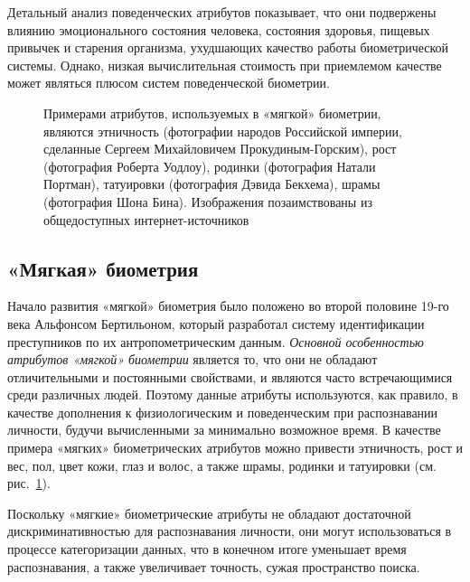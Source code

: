\documentclass[12pt]{book}
\begin{document}
{Детальный анализ поведенческих атрибутов показывает, что они подвержены влиянию эмоционального состояния человека, состояния здоровья, пищевых привычек и старения организма, ухудшающих качество работы биометрической системы. Однако, низкая вычислительная стоимость при приемлемом качестве может являться плюсом систем поведенческой биометрии.

}

\begin{figure}[]
\caption{Примерами атрибутов, используемых в «мягкой» биометрии, являются этничность (фотографии народов Российской империи, сделанные Сергеем Михайловичем Прокудиным-Горским), рост (фотография Роберта Уодлоу), родинки (фотография Натали Портман), татуировки (фотография Дэвида Бекхема), шрамы (фотография Шона Бина). Изображения позаимствованы из общедоступных интернет-источников}
\label{fig:figure_1_6}
\end{figure}

\subsection{«Мягкая» биометрия}

\large{Начало развития «мягкой» биометрия \cite{unar_2014} было положено во второй половине 19-го века Альфонсом Бертильоном, который разработал систему идентификации преступников по их антропометрическим данным. \textit{Основной особенностью атрибутов «мягкой» биометрии} является то, что они не обладают отличительными и постоянными свойствами, и являются часто встречающимися среди различных людей. Поэтому данные атрибуты используются, как правило, в качестве дополнения к физиологическим и поведенческим при распознавании личности, будучи вычисленными за минимально возможное время. В качестве примера «мягких» биометрических атрибутов можно привести этничность, рост и вес, пол, цвет кожи, глаз и волос, а также шрамы, родинки и татуировки (см. рис.~\ref{fig:figure_1_6}).}

\large{Поскольку «мягкие» биометрические атрибуты не обладают достаточной дискриминативностью для распознавания личности, они могут использоваться в процессе категоризации данных, что в конечном итоге уменьшает время распознавания, а также увеличивает точность, сужая пространство поиска.}
\end{document}
